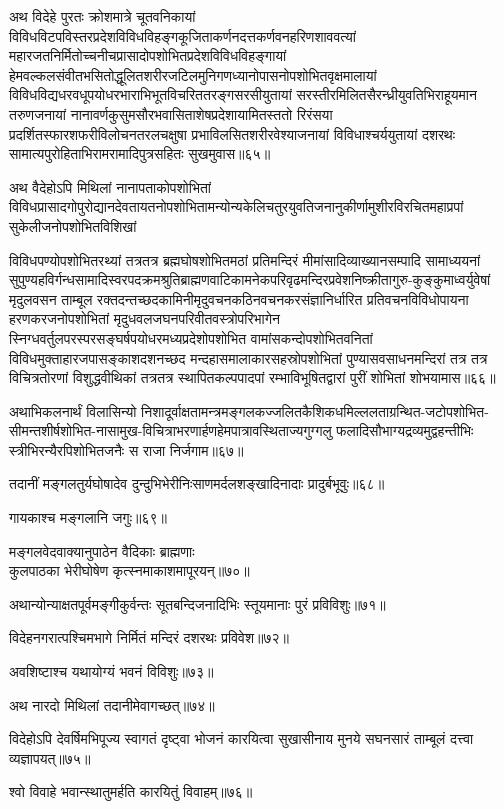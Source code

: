 \begin{flushleft}
अथ विदेहे पुरतः क्रोशमात्रे चूतवनिकायां विविधविटपविस्तरप्रदेशविविधविहङ्गकूजिताकर्णनदत्तकर्णवनहरिणशाववत्यां महारजतनिर्मितोच्चनीचप्रासादोपशोभितप्रदेशविविधविहङ्गायां हेमवल्कलसंवीतभसितोद्धूलितशरीरजटिलमुनिगणध्यानोपासनोपशोभितवृक्षमालायां विविधविद्यधरवधूपयोधरभाराभिभूतविचरिततरङ्गसरसीयुतायां सरस्तीरमिलितसैरन्ध्रीयुवतिभिराहूयमान तरुणजनायां नानावर्णकुसुमसौरभवासिताशेषप्रदेशायामितस्ततो रिरंसया प्रदर्शितस्फारशफरीविलोचनतरलचक्षुषा प्रभाविलसितशरीरवेश्याजनायां विविधाश्चर्ययुतायां दशरथः सामात्यपुरोहिताभिरामरामादिपुत्रसहितः सुखमुवास॥६५॥

अथ वैदेहोऽपि मिथिलां नानापताकोपशोभितां विविधप्रासादगोपुरोद्यानदेवतायतनोपशोभितामन्योन्यकेलिचतुरयुवतिजनानुकीर्णामुशीरविरचितमहाप्रपां सुकेलीजनोपशोभितविशिखां

विविधपण्योपशोभितरथ्यां तत्रतत्र ब्रह्मघोषशोभितमठां प्रतिमन्दिरं मीमांसादिव्याख्यानसम्पादि सामाध्ययनां सुपुण्यहविर्गन्धसामादिस्वरपदक्रमश्रुतिब्राह्मणवाटिकामनेकपरिवृढमन्दिरप्रवेशनिष्क्रीतागुरु-कुङ्कुमाध्वर्युवेषां मृदुलवसन ताम्बूल रक्तदन्तच्छदकामिनीमृदुवचनकठिनवचनकरसंज्ञानिर्धारित प्रतिवचनविविधोपायना हरणकरजनोपशोभितां मृदुधवलजघनपरिवीतवस्त्रोपरिभागेन स्निग्धवर्तुलपरस्परसङ्घर्षपयोधरमध्यप्रदेशोपशोभित वामांसकन्दोपशोभितवनितां विविधमुक्ताहारजपासङ्काशदशनच्छद मन्दहासमालाकारसहस्रोपशोभितां पुण्यासवसाधनमन्दिरां तत्र तत्र विचित्रतोरणां विशुद्धवीथिकां तत्रतत्र स्थापितकल्पपादपां रम्भाविभूषितद्वारां पुरीं शोभितां शोभयामास॥६६॥

अथाभिकलनार्थं विलासिन्यो निशादूर्वाक्षतामन्त्रमङ्गलकज्जलितकैशिकधमिल्ललताग्रन्थित-जटोपशोभित-सीमन्तशीर्षशोभित-नासामुख-विचित्राभरणार्हणहेमपात्रावस्थिताज्यगुग्गलु फलादिसौभाग्यद्रव्यमुद्वहन्तीभिः स्त्रीभिरन्यैरपिशोभितजनैः स राजा निर्जगाम॥६७॥

तदानीं मङ्गलतुर्यघोषादेव दुन्दुभिभेरीनिःसाणमर्दलशङ्खादिनादाः प्रादुर्बभूवुः॥६८॥

गायकाश्च मङ्गलानि जगुः॥६९॥

मङ्गलवेदवाक्यानुपाठेन वैदिकाः ब्राह्मणाः\\
कुलपाठका भेरीघोषेण कृत्स्नमाकाशमापूरयन्॥७०॥

अथान्योन्याक्षतपूर्वमङ्गीकुर्वन्तः सूतबन्दिजनादिभिः स्तूयमानाः पुरं प्रविविशुः॥७१॥

विदेहनगरात्पश्चिमभागे निर्मितं मन्दिरं दशरथः प्रविवेश॥७२॥

अवशिष्टाश्च यथायोग्यं भवनं विविशुः॥७३॥

अथ नारदो मिथिलां तदानीमेवागच्छत्॥७४॥

विदेहोऽपि देवर्षिमभिपूज्य स्वागतं दृष्ट्वा भोजनं कारयित्वा सुखासीनाय मुनये सघनसारं ताम्बूलं दत्त्वा व्यज्ञापयत्॥७५॥

श्वो विवाहे भवान्स्थातुमर्हति कारयितुं विवाहम्॥७६॥


\end{flushleft}
